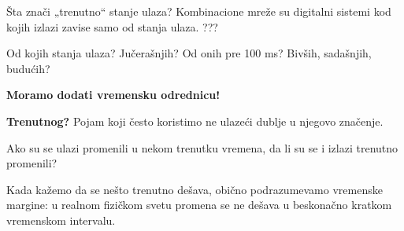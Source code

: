 \begin{frame}[label=02-s002]{Šta znači „trenutno“ stanje ulaza?}
\fontsize{11}{12.5}\selectfont
Kombinacione mreže su digitalni sistemi kod kojih izlazi zavise samo od stanja ulaza. \alert{???}
\par\vspace{1.5mm}
Od kojih stanja ulaza? Jučerašnjih? Od onih pre 100 ms? Bivših, sadašnjih, budućih?\par
\textbf{Moramo dodati vremensku odrednicu!}
\par\vspace{1.5mm}
\par\vspace{1.5mm}
\textbf{Trenutnog?} Pojam koji često koristimo ne ulazeći dublje u njegovo značenje.\par
Ako su se ulazi promenili u nekom trenutku vremena, da li su se i izlazi \alert{trenutno} promenili?
\par\vspace{1.5mm}
Kada kažemo da se nešto trenutno dešava, obično podrazumevamo vremenske margine: u realnom fizičkom svetu promena se ne dešava u beskonačno kratkom vremenskom intervalu.
\end{frame}
